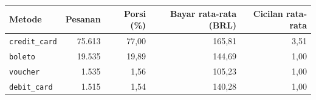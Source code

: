 \begin{tabular}{lrrrr}
\toprule
Metode & Pesanan & Porsi (\%) & Bayar rata-rata (BRL) & Cicilan rata-rata \\
\midrule
\texttt{credit\_card} & 75.613 & 77,00 & 165,81 & 3,51 \\
\texttt{boleto} & 19.535 & 19,89 & 144,69 & 1,00 \\
\texttt{voucher} & 1.535 & 1,56 & 105,23 & 1,00 \\
\texttt{debit\_card} & 1.515 & 1,54 & 140,28 & 1,00 \\
\bottomrule
\end{tabular}

